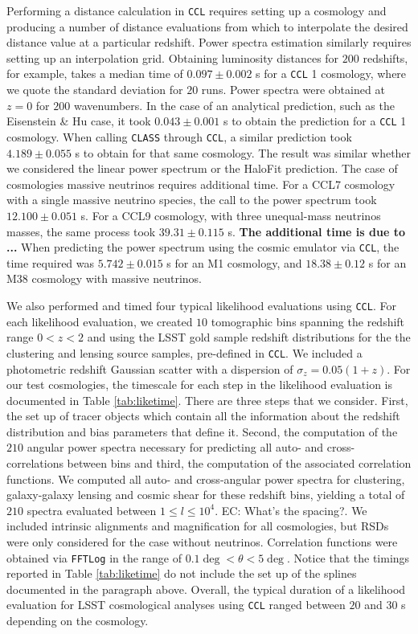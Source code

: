 \documentclass[\docopts]{\docclass}
\newcommand{\elisa}[1]{\textcolor{green!10!orange!90!}{EC: #1}}
\newcommand{\ccl}{{\tt CCL}\xspace}
\begin{document}
Performing a distance calculation in \ccl requires setting up a cosmology and producing a number of distance evaluations from which to interpolate the desired distance value at a particular redshift. Power spectra estimation similarly requires setting up an interpolation grid. Obtaining luminosity distances for $200$ redshifts, for example, takes a median time of $0.097\pm0.002$ s for a \ccl1 cosmology, where we quote the standard deviation for $20$ runs. Power spectra were obtained at $z=0$ for $200$ wavenumbers. In the case of an analytical prediction, such as the Eisenstein \& Hu case, it took $0.043\pm0.001$ s to obtain the prediction for a \ccl1 cosmology. When calling {\tt CLASS} through \ccl, a similar prediction took $4.189\pm 0.055$ s to obtain for that same cosmology. The result was similar whether we considered the linear power spectrum or the HaloFit prediction. The case of cosmologies massive neutrinos requires additional time. For a CCL7 cosmology with a single massive neutrino species, the call to the power spectrum took $12.100\pm 0.051$ s. For a CCL9 cosmology, with three unequal-mass neutrinos masses, the same process took $39.31 \pm 0.115$ s. {\bf The additional time is due to ...} When predicting the power spectrum using the cosmic emulator via \ccl, the time required was $5.742\pm 0.015$ s for an M1 cosmology, and $18.38\pm 0.12$ s for an M38 cosmology with massive neutrinos. 

We also performed and timed four typical likelihood evaluations using \ccl. For each likelihood evaluation, we created $10$ tomographic bins spanning the redshift range $0<z<2$ and using the LSST gold sample redshift distributions for the the clustering and lensing source samples, pre-defined in \ccl. We included a photometric redshift Gaussian scatter with a dispersion of $\sigma_z=0.05(1+z)$.  For our test cosmologies, the timescale for each step in the likelihood evaluation is documented in Table \ref{tab:liketime}. There are three steps that we consider. First, the set up of tracer objects which contain all the information about the redshift distribution and bias parameters that define it. Second, the computation of the $210$ angular power spectra necessary for predicting all auto- and cross-correlations between bins and third, the computation of the associated correlation functions. We computed all auto- and cross-angular power spectra for clustering, galaxy-galaxy lensing and cosmic shear for these redshift bins, yielding a total of $210$ spectra evaluated between $1\leq l\leq 10^4$. \elisa{What's the spacing?}. We included intrinsic alignments and magnification for all cosmologies, but RSDs were only considered for the case without neutrinos. Correlation functions were obtained via {\tt FFTLog} in the range of $0.1\deg<\theta<5\deg$. Notice that the timings reported in Table \ref{tab:liketime} do not include the set up of the splines documented in the paragraph above. Overall, the typical duration of a likelihood evaluation for LSST cosmological analyses using \ccl ranged between $20$ and $30$ s depending on the cosmology. 
\end{document}
